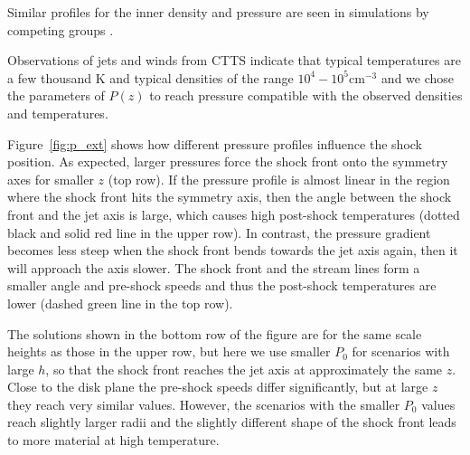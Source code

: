 Similar profiles for the inner density and pressure are seen in simulations by competing groups \citep[e.g.]{2005ApJ...630..945A,Li_Krasnopolsky_Blandford_2006,2008ApJ...678.1109M}.

Observations of jets and winds from CTTS indicate that typical temperatures are a few thousand K and typical densities of the range $10^4-10^5 \mathrm{ cm}^{-3}$ \citep[e.g.][]{2000A&amp;A...356L..41L,2007ApJ...657..897K} and we chose the parameters of $P(z)$ to reach pressure compatible with the observed densities and temperatures.

Figure~\ref{fig:p_ext} shows how different pressure profiles influence the shock position. As expected, larger pressures force the shock front onto the symmetry axes for smaller $z$ (top row). If the pressure profile is almost linear in the region where the shock front hits the symmetry axis, then the angle between the shock front and the jet axis is large, which causes high post-shock temperatures (dotted black and solid red line in the upper row). In contrast, the pressure gradient becomes less steep when the shock front bends towards the jet axis again, then it will approach the axis slower. The shock front and the stream lines form a smaller angle and pre-shock speeds and thus the post-shock temperatures are lower (dashed green line in the top row).

The solutions shown in the bottom row of the figure are for the same scale heights as those in the upper row, but here we use smaller $P_0$ for scenarios with large $h$, so that the shock front reaches the jet axis at approximately the same $z$. Close to the disk plane the pre-shock speeds differ significantly, but at large $z$ they reach very similar values. However, the scenarios with the smaller $P_0$ values reach slightly larger radii and the slightly different shape of the shock front leads to more material at high temperature.